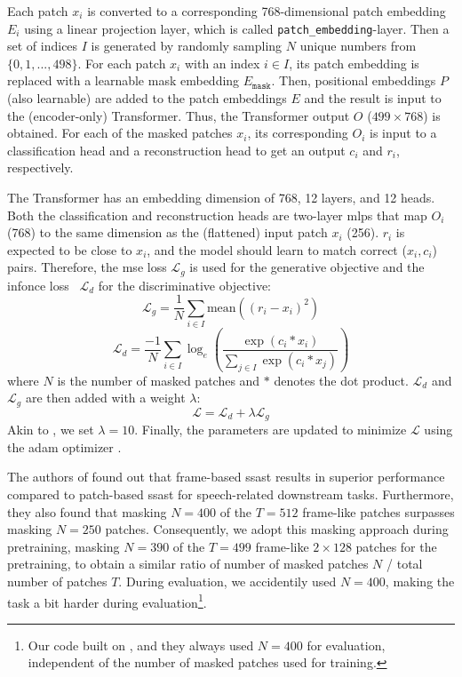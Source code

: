 Each patch $x_i$ is converted to a corresponding 768-dimensional patch embedding $E_i$ using a linear projection layer, which is called \texttt{patch\_embedding}-layer. Then a set of indices $I$ is generated by randomly sampling $N$ unique numbers from $\{0, 1, ..., 498\}$. For each patch $x_i$ with an index $i \in I$, its patch embedding is replaced with a learnable mask embedding $E_{\texttt{mask}}$. Then, positional embeddings $P$ (also learnable) are added to the patch embeddings $E$ and the result is input to the (encoder-only) Transformer. Thus, the Transformer output $O$ ($499\times768$) is obtained. For each of the masked patches $x_i$, its corresponding $O_i$ is input to a classification head and a reconstruction head to get an output $c_i$ and $r_i$, respectively. 

The Transformer has an embedding dimension of 768, 12 layers, and 12 heads. Both the classification and reconstruction heads are two-layer \glspl{mlp} that map $O_i$ (768) to the same dimension as the (flattened) input patch $x_i$ (256). $r_i$ is expected to be close to $x_i$, and the model should learn to match correct ($x_i, c_i$) pairs. Therefore, the \gls{mse} loss $\mathcal{L}_g$ is used for the generative objective and the \gls{infonce} loss~\cite{oord2018representation} $\mathcal{L}_d$ for the discriminative objective:
\begin{equation}
\label{eq:MSE}
\mathcal{L}_g=\frac{1}{N}\sum_{i \in I} \text{mean}\left((r_i-x_i)^2\right)
\end{equation}
\begin{equation}
\label{eq:InfoNCE}
\mathcal{L}_d=\frac{-1}{N}\sum_{i \in I}\log_e\left(\frac{\exp(c_i * x_i)}{\sum_{j \in I}\exp(c_i * x_j)}\right)
\end{equation}
where $N$ is the number of masked patches and $*$ denotes the dot product. $\mathcal{L}_d$ and $\mathcal{L}_g$ are then added with a weight $\lambda$:
\begin{equation}
\label{eq:pretraining-loss}
\mathcal{L}=\mathcal{L}_d + \lambda\mathcal{L}_g
\end{equation}
Akin to \cite{gong2022ssast}, we set $\lambda=10$. Finally, the parameters are updated to minimize $\mathcal{L}$ using the \gls{adam} optimizer \cite{kingma2015adam}. 

The authors of \cite{gong2022ssast} found out that frame-based \gls{ssast} results in superior performance compared to patch-based \gls{ssast} for speech-related downstream tasks. Furthermore, they also found that masking $N=400$ of the $T=512$ frame-like patches surpasses masking $N=250$ patches. Consequently, we adopt this masking approach during pretraining, masking $N=390$ of the $T=499$ frame-like $2 \times 128$ patches for the pretraining, to obtain a similar ratio of number of masked patches $N$ / total number of patches $T$. During evaluation, we accidentily used $N=400$, making the task a bit harder during evaluation\footnote{Our code built on \cite{gong2022ssast}, and they always used $N=400$ for evaluation, independent of the number of masked patches used for training.}.

